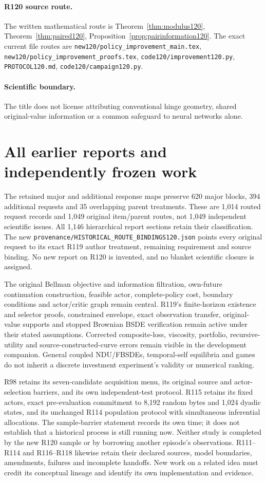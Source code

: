 \paragraph{R120 source route.}
The written mathematical route is Theorem~\ref{thm:modulus120}, Theorem~\ref{thm:paired120}, Proposition~\ref{prop:pairinformation120}. The exact current file routes are \nolinkurl{new120/policy_improvement_main.tex}, \nolinkurl{new120/policy_improvement_proofs.tex}, \nolinkurl{code120/improvement120.py}, \nolinkurl{PROTOCOL120.md}, \nolinkurl{code120/campaign120.py}.
\paragraph{Scientific boundary.}
The title does not license attributing conventional hinge geometry, shared original-value information or a common safeguard to neural networks alone.
\section{All earlier reports and independently frozen work}
The retained major and additional response maps preserve 620 major blocks,
394 additional requests and 35 overlapping parent treatments. These are
1,014 routed request records and 1,049 original item/parent routes, not
1,049 independent scientific issues. All 1,146 hierarchical report sections
retain their classification. The new
\nolinkurl{provenance/HISTORICAL_ROUTE_BINDINGS120.json}
points every original request to its exact R119 author treatment, remaining
requirement and source binding. No new report on R120 is invented, and no
blanket scientific closure is assigned.

The original Bellman objective and information filtration, own-future
continuation construction, feasible actor, complete-policy cost, boundary
conditions and actor/critic graph remain central. R119's finite-horizon
existence and selector proofs, constrained envelope, exact observation
transfer, original-value supports and stopped Brownian BSDE verification
remain active under their stated assumptions. Corrected composite-loss,
viscosity, portfolio, recursive-utility and source-constructed-curve errors
remain visible in the development companion. General coupled NDU/FBSDEs,
temporal-self equilibria and games do not inherit a discrete investment
experiment's validity or numerical ranking.

R98 retains its seven-candidate acquisition menu, its original source and
actor-selection barriers, and its own independent-test protocol. R115
retains its fixed actors, exact pre-evaluation commitment to 8,192 random
bytes and 1,024 dyadic states, and its unchanged R114 population protocol
with simultaneous inferential allocations. The sample-barrier statement
records its own time; it does not establish that a historical process is
still running now. Neither study is completed by the new R120 sample
or by borrowing another episode's observations. R111--R114 and
R116--R118 likewise retain their declared sources, model boundaries,
amendments, failures and incomplete handoffs. New work on a related idea
must credit its conceptual lineage and identify its own implementation
and evidence.

